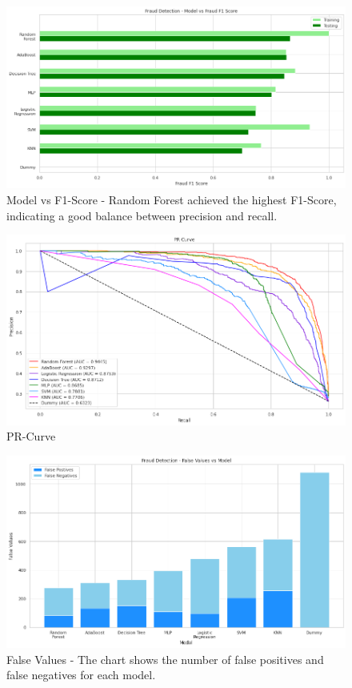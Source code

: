 \documentclass[10pt]{article}
\begin{document}
\begin{figure}[H]
	\centering
	\includegraphics[height = 0.37\textheight]{img/fraud_f1_score.png}
	\caption{Model vs F1-Score - Random Forest achieved the highest F1-Score, indicating a good balance between precision and recall.}
\end{figure}
\begin{figure}[H]
	\centering
	\includegraphics[height = 0.37\textheight]{img/PR_Curve.png}
	\caption{PR-Curve}
\end{figure}
\begin{figure}[H]
	\centering
	\includegraphics[height = 0.37\textheight]{img/fraud_detection_false_values.png}
	\caption{False Values - The chart shows the number of false positives and false negatives for each model.}
\end{figure}
\end{document}
